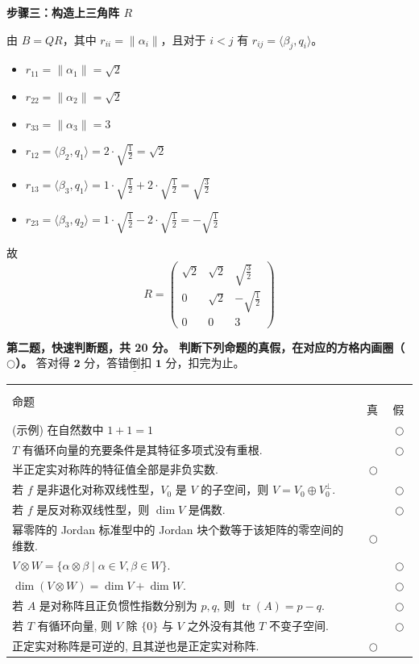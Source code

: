 \begin{enumerate}
\textbf{步骤三：构造上三角阵 $R$}

由 $B=QR$，其中 $r_{ii}=\|\alpha_i\|$，且对于 $i<j$ 有 $r_{ij}=\langle\beta_j,q_i\rangle$。
\begin{itemize}
\item $r_{11}=\|\alpha_1\|=\sqrt2$
\item $r_{22}=\|\alpha_2\|=\sqrt2$
\item $r_{33}=\|\alpha_3\|=3$
\item $r_{12}=\langle\beta_2,q_1\rangle=2\cdot\sqrt{\tfrac12}=\sqrt2$
\item $r_{13}=\langle\beta_3,q_1\rangle=1\cdot\sqrt{\tfrac12}+2\cdot\sqrt{\tfrac12}=\sqrt{\tfrac32}$
\item $r_{23}=\langle\beta_3,q_2\rangle=1\cdot\sqrt{\tfrac12}-2\cdot\sqrt{\tfrac12}=-\sqrt{\tfrac12}$
\end{itemize}
故
\[R=
\begin{pmatrix}
\sqrt2 & \sqrt2 & \sqrt{\tfrac32} \\
0 & \sqrt2 & -\sqrt{\tfrac12} \\
0 & 0 & 3
\end{pmatrix}\]
\end{enumerate}

\textbf{第二题，快速判断题，共 20 分。
判断下列命题的真假，在对应的方格内画圈（$\bigcirc$）。}
$\underline{\textbf{答对得 2 分，答错倒扣 1 分，扣完为止}}$。

\begin{center}\begin{tabular}{lcc}
命题 & \,真\, & \,假\, \\
(示例) 在自然数中 $1+1=1$ & & $\bigcirc$ \\
$T$ 有循环向量的充要条件是其特征多项式没有重根. & & $\bigcirc$ \\
半正定实对称阵的特征值全部是非负实数. & $\bigcirc$ & \\
若 $f$ 是非退化对称双线性型，$V_0$ 是 $V$ 的子空间，则 $V=V_0\oplus V_0^\perp$. & & $\bigcirc$ \\
若 $f$ 是反对称双线性型，则 $\dim V$ 是偶数. & & $\bigcirc$ \\
幂零阵的 Jordan 标准型中的 Jordan 块个数等于该矩阵的零空间的维数. & $\bigcirc$ & \\
$V\otimes W=\{\alpha\otimes\beta\mid \alpha\in V,\beta\in W\}$. & & $\bigcirc$ \\
$\dim(V\otimes W)=\dim V+\dim W$. & & $\bigcirc$ \\
若 $A$ 是对称阵且正负惯性指数分别为 $p,q$, 则 $\operatorname{tr}(A)=p-q$. & & $\bigcirc$ \\
若 $T$ 有循环向量, 则 $V$ 除 $\{0\}$ 与 $V$ 之外没有其他 $T$ 不变子空间. & & $\bigcirc$ \\
正定实对称阵是可逆的, 且其逆也是正定实对称阵. & $\bigcirc$ & 
\end{tabular}\end{center}

